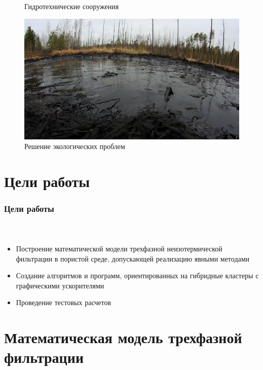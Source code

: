 \documentclass[10pt,pdf,hyperref={unicode}]{beamer} %
\begin{document}
\begin{frame}
\begin{center}
\begin{figure}
\begin{minipage}[h]{0.43\textwidth}
\caption{\small{Гидротехнические сооружения}}
\end{minipage}
\hspace{8mm}
\begin{minipage}[h]{0.43\textwidth}
\includegraphics[width=1.0\textwidth]{dirty169.jpg}
\caption{\small{Решение экологических проблем}}
\end{minipage}
\end{figure}
\end{center}
\end{frame}

\section{Цели работы}

\begin{frame}
\begin{center}
\frametitle{Цели работы}
\framesubtitle{\ }
\begin{itemize}
\item {\large Построение математической модели трехфазной неизотермической фильтрации в пористой среде, допускающей реализацию явными методами\\}
\vspace{0.5cm}
\item {\large Создание алгоритмов и программ, ориентированных на гибридные кластеры с графическими ускорителями\\}
\vspace{0.5cm}
\item {\large Проведение тестовых расчетов}
\end{itemize}
\end{center}
\end{frame}

\section{Математическая модель трехфазной фильтрации}
\end{document}
